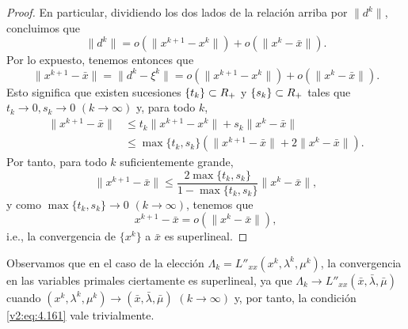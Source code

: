 \begin{proof}
    En particular, dividiendo los dos lados de la relación arriba por $\|d^k\|$, concluimos que
    \[
        \|d^k\| = o(\|x^{k+1} - x^k\|) + o(\|x^k - \bar{x}\|).
    \]
    Por lo expuesto, tenemos entonces que
    \[
        \|x^{k+1} - \bar{x}\| = \|d^k - \xi^k\| = o(\|x^{k+1} - x^k\|) + o(\|x^k - \bar{x}\|).
    \]
    Esto significa que existen sucesiones $\{t_k\} \subset R_+$ y $\{s_k\} \subset R_+$ tales que $t_k \to 0, s_k \to 0$ $(k \to \infty)$ y, para todo $k$,
    \begin{align*}
        \|x^{k+1} - \bar{x}\| &\le t_k\|x^{k+1} - x^k\| + s_k\|x^k - \bar{x}\| \\
        &\le \max\{t_k, s_k\} (\|x^{k+1} - \bar{x}\| + 2\|x^k - \bar{x}\|).
    \end{align*}
    Por tanto, para todo $k$ suficientemente grande,
    \[
        \|x^{k+1} - \bar{x}\| \le \frac{2\max\{t_k, s_k\}}{1 - \max\{t_k, s_k\}} \|x^k - \bar{x}\|,
    \]
    y como $\max\{t_k, s_k\} \to 0$ $(k \to \infty)$, tenemos que
    \[
        x^{k+1} - \bar{x} = o(\|x^k - \bar{x}\|),
    \]
    i.e., la convergencia de $\{x^k\}$ a $\bar{x}$ es superlineal.
\end{proof}

Observamos que en el caso de la elección $\Lambda_k = L''_{xx}(x^k, \lambda^k, \mu^k)$, la convergencia en las variables primales ciertamente es superlineal, ya que $\Lambda_k \to L''_{xx}(\bar{x}, \bar{\lambda}, \bar{\mu})$ cuando $(x^k, \lambda^k, \mu^k) \to (\bar{x}, \bar{\lambda}, \bar{\mu})$ $(k \to \infty)$ y, por tanto, la condición \eqref{v2:eq:4.161} vale trivialmente.